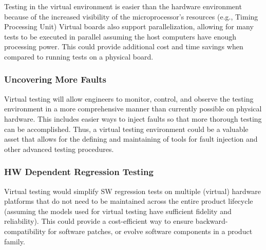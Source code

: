 Testing in the virtual environment is easier than the hardware environment because of the increased visibility of the microprocessor’s resources (e.g., Timing Processing Unit)
Virtual boards also support parallelization, allowing for many tests to be executed in parallel assuming the host computers have enough processing power. This could provide additional cost and time savings when compared to running tests on a physical board.

\subsubsection{Uncovering More Faults}
Virtual testing will allow engineers to monitor, control, and observe the testing environment in a more comprehensive manner than currently possible on physical hardware. This includes easier ways to inject faults so that more thorough testing can be accomplished.
Thus, a virtual testing environment could be a valuable asset that allows for the defining and maintaining of tools for fault injection and other advanced testing procedures.

\subsubsection{HW Dependent Regression Testing}
Virtual testing would simplify SW regression tests on multiple (virtual) hardware platforms that do not need to be maintained across the entire product lifecycle (assuming the models used for virtual testing have sufficient fidelity and reliability). This could provide a cost-efficient way to ensure backward-compatibility for software patches, or evolve software components in a product family.

